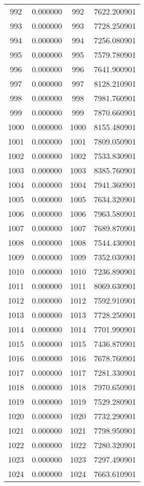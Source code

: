 \documentclass[12pt]{article}
\begin{document}
\begin{longtable}{@{}cccc@{}}
992 & 0.000000 & 992 & 7622.200901 \\
993 & 0.000000 & 993 & 7728.250901 \\
994 & 0.000000 & 994 & 7256.080901 \\
995 & 0.000000 & 995 & 7579.780901 \\
996 & 0.000000 & 996 & 7641.900901 \\
997 & 0.000000 & 997 & 8128.210901 \\
998 & 0.000000 & 998 & 7981.760901 \\
999 & 0.000000 & 999 & 7870.660901 \\
1000 & 0.000000 & 1000 & 8155.480901 \\
1001 & 0.000000 & 1001 & 7809.050901 \\
1002 & 0.000000 & 1002 & 7533.830901 \\
1003 & 0.000000 & 1003 & 8385.760901 \\
1004 & 0.000000 & 1004 & 7941.360901 \\
1005 & 0.000000 & 1005 & 7634.320901 \\
1006 & 0.000000 & 1006 & 7963.580901 \\
1007 & 0.000000 & 1007 & 7689.870901 \\
1008 & 0.000000 & 1008 & 7544.430901 \\
1009 & 0.000000 & 1009 & 7352.030901 \\
1010 & 0.000000 & 1010 & 7236.890901 \\
1011 & 0.000000 & 1011 & 8069.630901 \\
1012 & 0.000000 & 1012 & 7592.910901 \\
1013 & 0.000000 & 1013 & 7728.250901 \\
1014 & 0.000000 & 1014 & 7701.990901 \\
1015 & 0.000000 & 1015 & 7436.870901 \\
1016 & 0.000000 & 1016 & 7678.760901 \\
1017 & 0.000000 & 1017 & 7281.330901 \\
1018 & 0.000000 & 1018 & 7970.650901 \\
1019 & 0.000000 & 1019 & 7529.280901 \\
1020 & 0.000000 & 1020 & 7732.290901 \\
1021 & 0.000000 & 1021 & 7798.950901 \\
1022 & 0.000000 & 1022 & 7280.320901 \\
1023 & 0.000000 & 1023 & 7297.490901 \\
1024 & 0.000000 & 1024 & 7663.610901 \\

\end{longtable}
\end{document}
